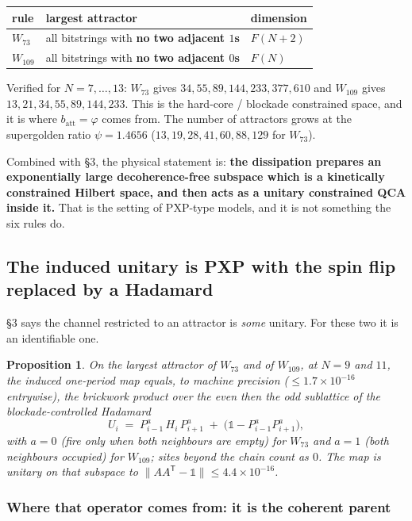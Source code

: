 \documentclass[11pt]{article}
\theoremstyle{plain}
\newtheorem{proposition}{Proposition}
\begin{document}
\begin{center}
\begin{tabular}{lll}
\toprule
rule & largest attractor & dimension \\
\midrule
$W_{73}$  & all bitstrings with \textbf{no two adjacent $1$s} & $F(N+2)$ \\
$W_{109}$ & all bitstrings with \textbf{no two adjacent $0$s} & $F(N)$ \\
\bottomrule
\end{tabular}
\end{center}

\noindent Verified for $N=7,\dots,13$: $W_{73}$ gives $34,55,89,144,233,377,610$
and $W_{109}$ gives $13,21,34,55,89,144,233$. This is the hard-core / blockade
constrained space, and it is where $b_\mathrm{att}=\varphi$ comes from. The
number of attractors grows at the supergolden ratio $\psi=1.4656$
($13,19,28,41,60,88,129$ for $W_{73}$).

Combined with \S3, the physical statement is: \textbf{the dissipation prepares an
exponentially large decoherence-free subspace which is a kinetically constrained
Hilbert space, and then acts as a unitary constrained QCA inside it.} That is the
setting of PXP-type models, and it is not something the six rules do.

\subsection{The induced unitary is PXP with the spin flip replaced by a Hadamard}

\S3 says the channel restricted to an attractor is \emph{some} unitary. For these
two it is an identifiable one.

\begin{proposition}
On the largest attractor of $W_{73}$ and of $W_{109}$, at $N=9$ and $11$, the
induced one-period map equals, to machine precision
($\le1.7\times10^{-16}$ entrywise), the brickwork product over the even then the
odd sublattice of the blockade-controlled Hadamard
\[
  U_i \;=\; P^{a}_{i-1}\,H_i\,P^{a}_{i+1}
        \;+\; \bigl(\mathbb{1}-P^{a}_{i-1}P^{a}_{i+1}\bigr),
\]
with $a=0$ (fire only when both neighbours are \emph{empty}) for $W_{73}$ and
$a=1$ (both neighbours \emph{occupied}) for $W_{109}$; sites beyond the chain
count as $0$. The map is unitary on that subspace to
$\lVert AA^{\mathsf T}-\mathbb{1}\rVert\le4.4\times10^{-16}$.
\end{proposition}

\subsubsection*{Where that operator comes from: it is the coherent parent}
\end{document}
